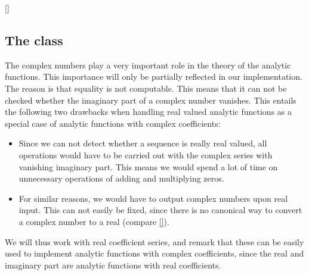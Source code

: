 \ref{}


\subsection{The class }\label{sec: The class COMPLEX}

The complex numbers play a very important role in the theory of the analytic functions. This importance will only be partially reflected in our implementation. The reason is that equality is not computable. This means that it can not be checked whether the imaginary part of a complex number vanishes. This entails the following two drawbacks when handling real valued analytic functions as a special case of analytic functions with complex coefficients:
\begin{itemize}
\item Since we can not detect whether a sequence is really real valued, all operations would have to be carried out with the complex series with vanishing imaginary part. This means we would spend a lot of time on unnecessary operations of adding and multiplying zeros.
\item For similar reasons, we would have to output complex numbers upon real input. This can not easily be fixed, since there is no canonical way to convert a complex number to a real (compare \cref{}).
\end{itemize}
We will thus work with real coefficient series, and remark that these can be easily used to implement analytic functions with complex coefficients, since the real and imaginary part are analytic functions with real coefficients.

